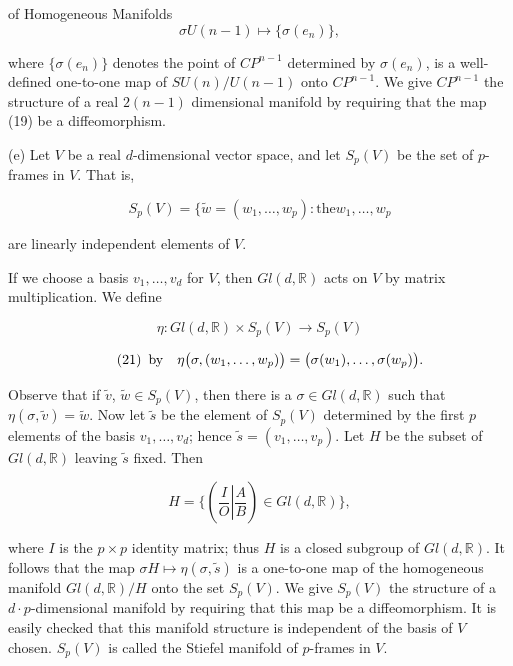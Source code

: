 \begin{examples}{of Homogeneous Manifolds}
\begin{equation}
\tag{19}\label{eq:3.65:19}
\sigma U(n-1)\mapsto\{\sigma(e_{n})\},
\end{equation}

where $\{\sigma(e_n)\}$ denotes the point of $CP^{n-1}$ determined by $\sigma(e_n)$, is a well-defined one-to-one map of $SU(n)/U(n-1)$ onto $CP^{n-1}$. We give $CP^{n-1}$ the structure of a real $2(n-1)$ dimensional manifold by requiring that the map (19) be a diffeomorphism.

(e) Let $V$ be a real $d$-dimensional vector space, and let $S_{p}(V)$ be the set of $p$-frames in $V$. That is,

\begin{equation}
\tag{20}\label{eq:3.65:20}
S_{p}(V)=\{\tilde{w}=(w_{1},\ldots,w_{p})\colon\mathrm{the}w_{1},\ldots,w_{p}
\end{equation}

are linearly independent elements of $V$.

If we choose a basis $v_{1}, \ldots, v_{d}$ for $V$, then $Gl(d,\mathbb{R})$ acts on $V$ by matrix multiplication. We define

\[
\eta\colon Gl(d,\mathbb{R})\times S_{p}(V)\to S_{p}(V)
\]

\begin{equation}
\tag{21}\label{eq:3.65:21}
\begin{array}{r l}{\mathrm{by}}&{\eta\big(\sigma,(w_{1},\ldots,w_{p})\big)=\big(\sigma(w_{1}),\ldots,\sigma(w_{p})\big).}\end{array}
\end{equation}

Observe that if $\tilde{v}$, $\tilde{w} \in S_p(V)$, then there is a $\sigma \in Gl(d, \mathbb{R})$ such that $\eta(\sigma, \tilde{v}) = \tilde{w}$. Now let $\tilde{s}$ be the element of $S_p(V)$ determined by the first $p$ elements of the basis $v_1, \ldots, v_d$; hence $\tilde{s} = (v_1, \ldots, v_p)$. Let $H$ be the subset of $Gl(d, \mathbb{R})$ leaving $\tilde{s}$ fixed. Then

\begin{equation}
\tag{22}\label{eq:3.65:22}
H=\Big\{\left(\frac{I}{O}\left|\frac{A}{B}\right.\right)\in{G l}(d,\mathbb{R})\Big\},
\end{equation}

where $I$ is the $p \times p$ identity matrix; thus $H$ is a closed subgroup of $Gl(d,\mathbb{R})$. It follows that the map $\sigma H \mapsto \eta(\sigma,\tilde{s})$ is a one-to-one map of the homogeneous manifold $Gl(d,\mathbb{R})/H$ onto the set $S_p(V)$. We give $S_p(V)$ the structure of a $d \cdot p$-dimensional manifold by requiring that this map be a diffeomorphism. It is easily checked that this manifold structure is independent of the basis of $V$ chosen. $S_p(V)$ is called the Stiefel manifold of $p$-frames in $V$. 


\end{examples}
